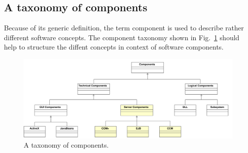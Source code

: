 \subsection{A taxonomy of components}

Because of its generic definition, the term component is used to describe
rather different software concepts.
The component taxonomy shown in Fig.~\ref{ComponentTaxonomy} should 
help to structure the diffent concepts in context of software components.

\begin{figure}[htbp]
    \begin{center}
        \includegraphics [width=15cm,angle=0] {Introduction/uml/ComponentTaxonomy}
        \caption{A taxonomy of components.}
        \label{ComponentTaxonomy}
    \end{center}
\end{figure}

